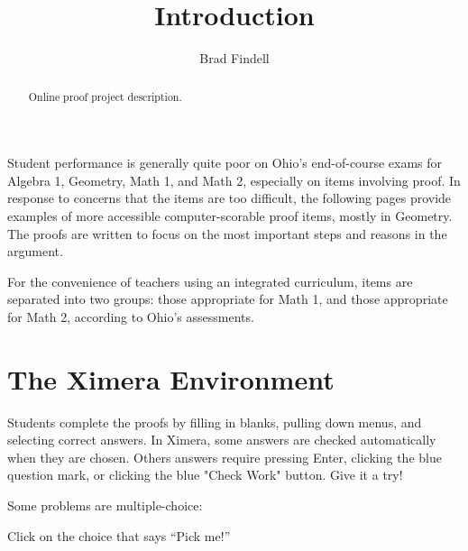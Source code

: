 \documentclass[nooutcomes]{ximera}
\title{Introduction}
\author{Brad Findell}
\begin{document}
\begin{abstract}
Online proof project description. 
\end{abstract}
\maketitle

Student performance is generally quite poor on Ohio's end-of-course exams for Algebra 1, Geometry, Math 1, and Math 2, especially on items involving proof.  In response to concerns that the items are too difficult, the following pages provide examples of more accessible computer-scorable proof items, mostly in Geometry.  The proofs are written to focus on the most important steps and reasons in the argument.

For the convenience of teachers using an integrated curriculum, items are separated into two groups: those appropriate for Math 1, and those appropriate for Math 2, according to Ohio's assessments.  



\section{The Ximera Environment}
Students complete the proofs by filling in blanks, pulling down menus, and selecting correct answers.  
In Ximera, some answers are checked automatically when they are chosen.  Others answers require pressing Enter, clicking the blue question mark, or clicking the blue "Check Work" button. Give it a try!  

\begin{example}
  Some problems are multiple-choice:
  \begin{multipleChoice}
  \end{multipleChoice}
  \begin{feedback}
    Click on the choice that says ``Pick me!''
  \end{feedback}
\end{example}
\end{document}
